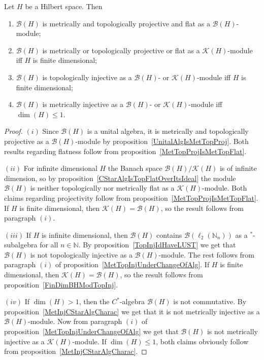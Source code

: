 \begin{proposition}\label{KHAndBHModBH} Let $H$ be a Hilbert space. Then

\begin{enumerate}[label = (\roman*)]
    \item $\mathcal{B}(H)$ is metrically and topologically projective and 
    flat as a $\mathcal{B}(H)$-module;

    \item $\mathcal{B}(H)$ is metrically or topologically projective or flat as
    a $\mathcal{K}(H)$-module iff $H$ is finite dimensional;

    \item $\mathcal{B}(H)$ is topologically injective as a $\mathcal{B}(H)$- or
    $\mathcal{K}(H)$-module iff $H$ is finite dimensional;

    \item $\mathcal{B}(H)$ is metrically injective as a $\mathcal{B}(H)$- or
    $\mathcal{K}(H)$-module iff $\dim(H)\leq 1$.
\end{enumerate}
\end{proposition}
\begin{proof} $(i)$ Since $\mathcal{B}(H)$ is a unital algebra, it is metrically
and topologically projective as a $\mathcal{B}(H)$-module by
proposition~\ref{UnitalAlgIsMetTopProj}. Both results regarding flatness follow
from proposition~\ref{MetTopProjIsMetTopFlat}.

$(ii)$ For infinite dimensional $H$ the Banach space
$\mathcal{B}(H)/\mathcal{K}(H)$ is of infinite dimension, so by
proposition~\ref{CStarAlgIsTopFlatOverItsIdeal} the module $\mathcal{B}(H)$ is
neither topologically nor metrically flat as a $\mathcal{K}(H)$-module. Both
claims regarding projectivity follow from
proposition~\ref{MetTopProjIsMetTopFlat}. If $H$ is finite dimensional, then
$\mathcal{K}(H)=\mathcal{B}(H)$, so the result follows from paragraph $(i)$.

$(iii)$ If $H$ is infinite dimensional, then $\mathcal{B}(H)$ contains
$\mathcal{B}(\ell_2(\mathbb{N}_n))$ as a ${}^*$-subalgebra for all
$n\in\mathbb{N}$. By proposition~\ref{TopInjIdHaveLUST} we get that
$\mathcal{B}(H)$ is not topologically injective as a $\mathcal{B}(H)$-module. The
rest follows from paragraph $(i)$ of
proposition~\ref{MetTopInjUnderChangeOfAlg}. If $H$ is finite dimensional, then
$\mathcal{K}(H)=\mathcal{B}(H)$, so the result follows from
proposition~\ref{FinDimBHModTopInj}.

$(iv)$ If $\dim(H)>1$, then the $C^*$-algebra $\mathcal{B}(H)$ is not commutative. 
By proposition~\ref{MetInjCStarAlgCharac} we get that it is not metrically
injective as a $\mathcal{B}(H)$-module. Now from paragraph $(i)$
of proposition~\ref{MetTopInjUnderChangeOfAlg} we get that $\mathcal{B}(H)$ is not
metrically injective as a $\mathcal{K}(H)$-module. If $\dim(H)\leq 1$, both claims
obviously follow from proposition~\ref{MetInjCStarAlgCharac}.
\end{proof}

